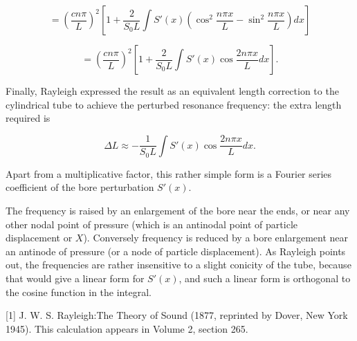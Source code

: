   \begin{equation*}=\left(\dfrac{c n \pi}{L}\right)^2 \left[1+\dfrac{2}{S_0L} 
  \int{S'(x) \left(\cos^2\dfrac{n \pi x}{L}-\sin^2 \dfrac{n \pi x}{L} \right) 
  dx}\right]\end{equation*} 

  \begin{equation*}=\left(\dfrac{c n \pi}{L}\right)^2 \left[1+\dfrac{2}{S_0L} 
  \int{S'(x) \cos\dfrac{2n \pi x}{L} dx}\right] . \tag{18}\end{equation*} 

  Finally, Rayleigh expressed the result as an equivalent length correction to 
  the cylindrical tube to achieve the perturbed resonance frequency: the extra 
  length required is 

  \begin{equation*}\Delta L \approx -\dfrac{1}{S_0L} \int{S'(x) \cos\dfrac{2n 
  \pi x}{L} dx} . \tag{19}\end{equation*} 

  Apart from a multiplicative factor, this rather simple form is a Fourier 
  series coefficient of the bore perturbation $S'(x)$. 

  The frequency is raised by an enlargement of the bore near the ends, or near 
  any other nodal point of pressure (which is an antinodal point of particle 
  displacement or $X$). Conversely frequency is reduced by a bore enlargement 
  near an antinode of pressure (or a node of particle displacement). As 
  Rayleigh points out, the frequencies are rather insensitive to a slight 
  conicity of the tube, because that would give a linear form for $S'(x)$, and 
  such a linear form is orthogonal to the cosine function in the integral. 

  \sectionreferences{}[1] J. W. S. Rayleigh:The Theory of Sound (1877, 
  reprinted by Dover, New York 1945). This calculation appears in Volume 2, 
  section 265. 